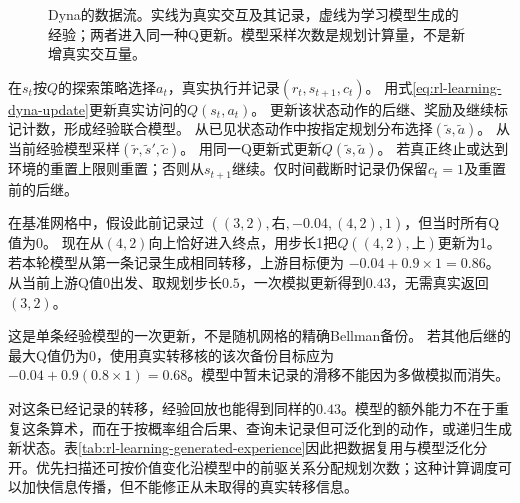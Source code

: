 \begin{figure}[t]
  \centering
  
  \caption{Dyna的数据流。实线为真实交互及其记录，虚线为学习模型生成的经验；两者进入同一种Q更新。模型采样次数是规划计算量，不是新增真实交互量。}
  \label{fig:rl-learning-dyna}
\end{figure}

\begin{algorithm}[随机表格Dyna的一轮交互]
  \label{alg:rl-learning-dyna}
  \begin{algorithmic}[1]
    \State 在$s_t$按$Q$的探索策略选择$a_t$，真实执行并记录$(r_t,s_{t+1},c_t)$。
    \State 用式\eqref{eq:rl-learning-dyna-update}更新真实访问的$Q(s_t,a_t)$。
    \State 更新该状态动作的后继、奖励及继续标记计数，形成经验联合模型。
      \State 从已见状态动作中按指定规划分布选择$(\widetilde s,\widetilde a)$。
      \State 从当前经验模型采样$(\widetilde r,\widetilde s',\widetilde c)$。
      \State 用同一Q更新式更新$Q(\widetilde s,\widetilde a)$。
    \EndFor
    \State 若真正终止或达到环境的重置上限则重置；否则从$s_{t+1}$继续。仅时间截断时记录仍保留$c_t=1$及重置前的后继。
  \end{algorithmic}
\end{algorithm}

\begin{example}[不返回上游也能传播一次奖励]
  \label{ex:rl-learning-dyna-grid}
  在基准网格中，假设此前记录过
  $((3,2),\text{右},-0.04,(4,2),1)$，但当时所有Q值为0。
  现在从$(4,2)$向上恰好进入终点，用步长1把$Q((4,2),\text{上})$更新为1。
  若本轮模型从第一条记录生成相同转移，上游目标便为
  $-0.04+0.9\times1=0.86$。从当前上游Q值0出发、取规划步长$0.5$，一次模拟更新得到$0.43$，无需真实返回$(3,2)$。

  这是单条经验模型的一次更新，不是随机网格的精确Bellman备份。
  若其他后继的最大Q值仍为0，使用真实转移核的该次备份目标应为
  $-0.04+0.9(0.8\times1)=0.68$。模型中暂未记录的滑移不能因为多做模拟而消失。
\end{example}

对这条已经记录的转移，经验回放也能得到同样的$0.43$。模型的额外能力不在于重复这条算术，而在于按概率组合后果、查询未记录但可泛化到的动作，或递归生成新状态。表\ref{tab:rl-learning-generated-experience}因此把数据复用与模型泛化分开。优先扫描还可按价值变化沿模型中的前驱关系分配规划次数；这种计算调度可以加快信息传播，但不能修正从未取得的真实转移信息。

